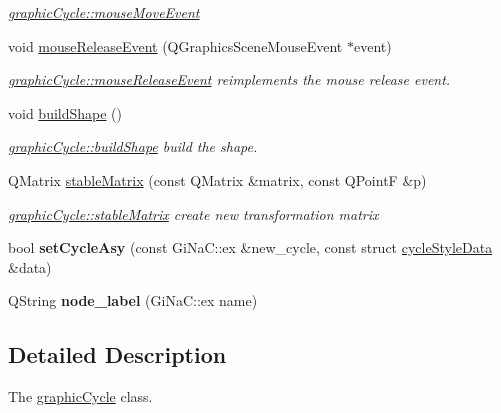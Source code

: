 \begin{DoxyCompactItemize}
\begin{DoxyCompactList}\small\item\em \mbox{\hyperlink{classgraphic_cycle_aec6514c9578de68150bf2eea9b4e80c4}{graphic\+Cycle\+::mouse\+Move\+Event}} \end{DoxyCompactList}\item 
void \mbox{\hyperlink{classgraphic_cycle_a10c7318e9cf6d79e0aad3eec5c1d697a}{mouse\+Release\+Event}} (Q\+Graphics\+Scene\+Mouse\+Event $\ast$event)
\begin{DoxyCompactList}\small\item\em \mbox{\hyperlink{classgraphic_cycle_a10c7318e9cf6d79e0aad3eec5c1d697a}{graphic\+Cycle\+::mouse\+Release\+Event}} reimplements the mouse release event. \end{DoxyCompactList}\item 
void \mbox{\hyperlink{classgraphic_cycle_ac3a007a95334380db1bcd9b8082cb36c}{build\+Shape}} ()
\begin{DoxyCompactList}\small\item\em \mbox{\hyperlink{classgraphic_cycle_ac3a007a95334380db1bcd9b8082cb36c}{graphic\+Cycle\+::build\+Shape}} build the shape. \end{DoxyCompactList}\item 
Q\+Matrix \mbox{\hyperlink{classgraphic_cycle_a1c3a094ad53a3705019c24869340ed51}{stable\+Matrix}} (const Q\+Matrix \&matrix, const Q\+PointF \&p)
\begin{DoxyCompactList}\small\item\em \mbox{\hyperlink{classgraphic_cycle_a1c3a094ad53a3705019c24869340ed51}{graphic\+Cycle\+::stable\+Matrix}} create new transformation matrix \end{DoxyCompactList}\item 
\mbox{\label{classgraphic_cycle_a58385898752cac06fb14fc527f908b8c}} 
bool {\bfseries set\+Cycle\+Asy} (const Gi\+Na\+C\+::ex \&new\+\_\+cycle, const struct \mbox{\hyperlink{structcycle_style_data}{cycle\+Style\+Data}} \&data)
\item 
\mbox{\label{classgraphic_cycle_a51c0fcf1c2b413a20113c0b4e10194d9}} 
Q\+String {\bfseries node\+\_\+label} (Gi\+Na\+C\+::ex name)
\end{DoxyCompactItemize}


\subsection{Detailed Description}
The \mbox{\hyperlink{classgraphic_cycle}{graphic\+Cycle}} class. 

